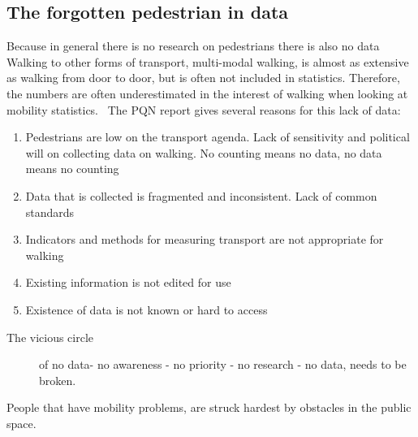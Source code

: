 \subsection{The forgotten pedestrian in data}
Because in general there is no research on pedestrians there is also no data~\cite{Sauter2010} Walking to other forms of transport, multi-modal walking, is almost as extensive as walking from door to door, but is often not included in statistics. Therefore, the numbers are often underestimated in the interest of walking when looking at mobility statistics.~\cite{VeiligheidNL2012, Sauter2010} The PQN report gives several reasons for this lack of data:
\begin{enumerate}
\item Pedestrians are low on the transport agenda. Lack of sensitivity and political will on collecting data on walking. No counting means no data, no data means no counting 
\item Data that is collected is fragmented and inconsistent. Lack of common standards 
\item Indicators and methods for measuring transport are not appropriate for walking
\item Existing information is not edited for use
\item Existence of data is not known or hard to access
\end{enumerate}

\begin{description}
	\item[The vicious circle] of no data- no awareness - no priority - no research - no data, needs to be broken.~\cite{Sauter2010}
	\end{description} 
People that have mobility problems, are struck hardest by obstacles in the public space.~\cite{VandeRidder2008} 


